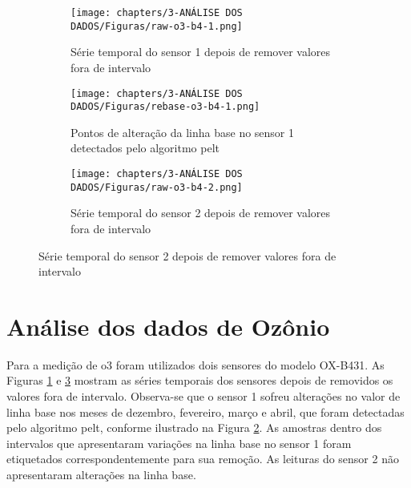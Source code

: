 \begin{figure}[h!]
    \centering
    \caption{Série temporal dos sensores de \acrshort{o3} modelo OX-B431}
    \begin{subfigure}{0.4\textwidth}
        \texttt{[image: chapters/3-ANÁLISE DOS DADOS/Figuras/raw-o3-b4-1.png]}
        \caption{Série temporal do sensor 1 depois de remover valores fora de intervalo}
        \label{fig:data-o3-1-raw}
    \end{subfigure}
    \hfill
    \begin{subfigure}{0.4\textwidth}
        \texttt{[image: chapters/3-ANÁLISE DOS DADOS/Figuras/rebase-o3-b4-1.png]}
        \caption{Pontos de alteração da linha base no sensor 1 detectados pelo algoritmo \acrshort{pelt}}
        \label{fig:data-rebase-o3-1}
    \end{subfigure}
    \hfill
    \begin{subfigure}{0.4\textwidth}
        \texttt{[image: chapters/3-ANÁLISE DOS DADOS/Figuras/raw-o3-b4-2.png]}
        \caption{Série temporal do sensor 2 depois de remover valores fora de intervalo}
        \label{fig:data-o3-2-raw}
    \end{subfigure}
    \label{fig:data-o3-raw-and-pelt}
\end{figure}

\section{Análise dos dados de Ozônio}

Para a medição de \acrshort{o3} foram utilizados dois sensores do modelo OX-B431. As Figuras \ref{fig:data-o3-1-raw} e \ref{fig:data-o3-2-raw} mostram as séries temporais dos sensores depois de removidos os valores fora de intervalo. Observa-se que o sensor 1 sofreu alterações no valor de linha base nos meses de dezembro, fevereiro, março e abril, que foram detectadas pelo algoritmo \acrshort{pelt}, conforme ilustrado na Figura \ref{fig:data-rebase-o3-1}. As amostras dentro dos intervalos que apresentaram variações na linha base no sensor 1 foram etiquetados correspondentemente para sua remoção. As leituras do sensor 2 não apresentaram alterações na linha base.


